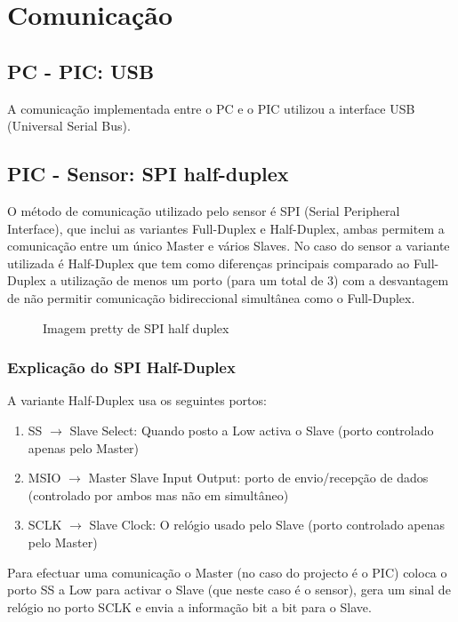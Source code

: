 \documentclass[a4paper]{article}
\begin{document}


\tableofcontents
\pagebreak

\section{Comunicação}

\subsection{PC - PIC: USB}
A comunicação implementada entre o PC e o PIC utilizou a interface USB (Universal Serial Bus).

\subsection{PIC - Sensor: SPI half-duplex}
O método de comunicação utilizado pelo sensor é SPI (Serial Peripheral Interface), que inclui as variantes Full-Duplex e Half-Duplex, ambas permitem a comunicação entre um único Master e vários Slaves.
No caso do sensor a variante utilizada é Half-Duplex que tem como diferenças principais comparado ao Full-Duplex a utilização de menos um porto (para um total de 3) com a desvantagem de não permitir comunicação bidireccional simultânea como o Full-Duplex.
\begin{figure}[H]
\centering

\caption{Imagem pretty de SPI half duplex}
\label{fig:Cherry_box}
\end{figure}

\subsubsection{Explicação do SPI Half-Duplex}  
A variante Half-Duplex usa os seguintes portos:
\begin{enumerate}
    \item SS $\rightarrow$ Slave Select: Quando posto a Low activa o Slave (porto controlado apenas pelo Master)
    \item MSIO $\rightarrow$ Master Slave Input Output: porto de envio/recepção de dados (controlado por ambos mas não em simultâneo)
    \item SCLK $\rightarrow$ Slave Clock: O relógio usado pelo Slave (porto controlado apenas pelo Master)
\end{enumerate}

Para efectuar uma comunicação o Master (no caso do projecto é o PIC) coloca o porto SS a Low para activar o Slave (que neste caso é o sensor), gera um sinal de relógio no porto SCLK e envia a informação bit a bit para o Slave.
\end{document}
